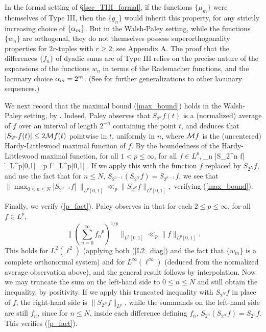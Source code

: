 \documentclass[oneside,11pt]{amsart}
\begin{document}
\begin{remark}\label{remark_WPR}
In the formal setting of \S \ref{sec_TIII_formal}, if the functions $\{\mu_m\}$ were themselves of Type III, then the $\{g_n\}$ would inherit this property, for any strictly increasing choice of $\{\alpha_m\}$. But in the Walsh-Paley setting, while the functions $\{w_n\}$ are orthogonal, they do not themselves possess superorthogonality properties for $2r$-tuples with $r\geq 2$; see Appendix A.
The proof that the differences $\{f_n\}$ of dyadic sums  are of Type III relies on the precise nature of the expansions of the functions $w_n$ in terms of the Rademacher functions,  and the lacunary choice $\alpha_m=2^m$. (See \cite{Pal32} for further generalizations to other lacunary sequences.) 
\end{remark}

We next record that the maximal bound (\ref{max_bound}) holds in the Walsh-Paley setting, by \cite[Thm. 1]{Pal32}.
Indeed, Paley observes   that  $S_{2^n}f(t)$ is a (normalized) average of $f$ over an interval of length $2^{-n}$ containing the point $t$, and deduces that $|S_{2^n}f(t)| \leq 2 \mathcal{M} f(t)$ pointwise in $t$, uniformly in $n$, where $\mathcal{M} f$ is the (uncentered) Hardy-Littlewood maximal function of $f$.  By the boundedness of the Hardy-Littlewood maximal function, for all $1<p\leq \infty$, for all $f \in L^p$,  
\beq\label{max_bound_WP}
 \| \sup_n |S_{2^n} f| \|_{L^p[0,1]} \ll_p \|   f \|_{L^p[0,1]} .
\eeq
If we apply this with the function $f$ replaced by $S_{2^{N}} f$, and use the fact that for $n \leq N$,  $S_{2^{n-1}}(S_{2^{N}} f) = S_{2^{n-1}}f$, we see that 
$ \| \max_{0 \leq n \leq N} |S_{2^{n-1}} f|\; \|_{L^p[0,1]} \ll_p \| S_{2^{N}} f\|_{L^p[0,1]},$
verifying (\ref{max_bound}).
 
 
 
 
 
 
 Finally, we verify (\ref{p_fact}).
 Paley observes in \cite[Lemma 7]{Pal32} that for each $2 \leq p \leq \infty$, for all $f \in L^p$,  
\[
\| (\sum_{n=0}^{\infty} {f_n}^p )^{1/p} \|_{L^p[0,1]} \ll_p \| f \|_{L^p[0,1]} .
\]
This holds for $L^2(\ell^2)$ (applying both (\ref{L2_diag}) and the fact that $\{w_m\}$ is a complete orthonormal system) and for $L^\infty(\ell^\infty)$ (deduced from the normalized average observation above), and the general result follows by interpolation.
Now we may truncate the sum on the left-hand side to $0 \leq n \leq N$ and still obtain the inequality, by positivity.  If we apply this truncated inequality  with $S_{2^{N}}f$ in place of $f$, the right-hand side is $\|S_{2^N}f\|_{L^p}$, while the summands on the left-hand side are still $f_n$, since   for $n \leq N$, inside each difference defining $f_n$,  $S_{2^n}(S_{2^{N}} f) = S_{2^n} f$. 
This verifies (\ref{p_fact}). 
 
\end{document}
